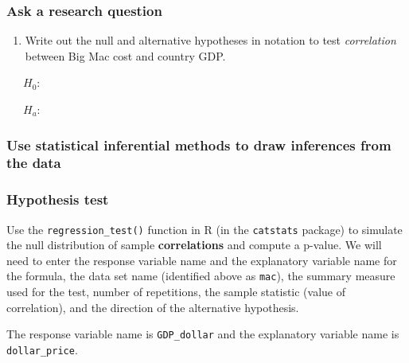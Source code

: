 \documentclass[
]{report}
\providecommand{\tightlist}{%
  \setlength{\itemsep}{0pt}\setlength{\parskip}{0pt}}
\begin{document}
\vspace{1.5in}

\newpage

\hypertarget{ask-a-research-question-6}{%
\subsubsection*{Ask a research question}\label{ask-a-research-question-6}}

\begin{enumerate}
\def\labelenumi{\arabic{enumi}.}
\setcounter{enumi}{5}
\tightlist
\item
  Write out the null and alternative hypotheses in notation to test \emph{correlation} between Big Mac cost and country GDP.
\end{enumerate}

~~~\(H_0:\)

~~~\(H_a:\)

\hypertarget{use-statistical-inferential-methods-to-draw-inferences-from-the-data-7}{%
\subsubsection*{Use statistical inferential methods to draw inferences from the data}\label{use-statistical-inferential-methods-to-draw-inferences-from-the-data-7}}

\hypertarget{hypothesis-test-4}{%
\subsubsection*{Hypothesis test}\label{hypothesis-test-4}}

Use the \texttt{regression\_test()} function in R (in the \texttt{catstats} package) to simulate the null distribution of sample \textbf{correlations} and compute a p-value. We will need to enter the response variable name and the explanatory variable name for the formula, the data set name (identified above as \texttt{mac}), the summary measure used for the test, number of repetitions, the sample statistic (value of correlation), and the direction of the alternative hypothesis.

The response variable name is \texttt{GDP\_dollar} and the explanatory variable name is \texttt{dollar\_price}.
\end{document}
